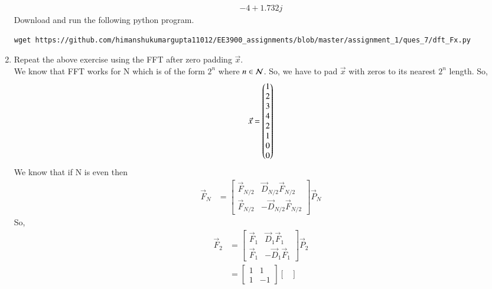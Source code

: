 \documentclass[journal,12pt,twocolumn]{IEEEtran}
\renewcommand\thesection{\arabic{section}}
\begin{document}
\begin{enumerate}[label=\arabic*.,ref=\thesection.\theenumi]
\begin{align}
{                     -4+1.732j}
           \end{align}
           Download and run the following python program.
           \begin{lstlisting}
wget https://github.com/himanshukumargupta11012/EE3900_assignments/blob/master/assignment_1/ques_7/dft_Fx.py
           \end{lstlisting}
     \item Repeat the above exercise using the FFT
           after zero padding $\vec{x}$. \\
           \solution  We know that FFT works for N  which is of the form $2^n$ where $n\in \cal N$.
           So, we have to pad $\vec{x}$ with zeros to its nearest $2^n$ length.
           So,
           \begin{align}
                \vec{x}=\begin{pmatrix}1 \\2\\3\\4\\2\\1\\0\\0\end{pmatrix}
           \end{align}
           We know that if N is even then
           \begin{align}
                \vec{F}_N & =\begin{bmatrix}
                                  \vec{F}_{N/2} & \vec{D}_{N/2}\vec{F}_{N/2}  \\
                                  \vec{F}_{N/2} & -\vec{D}_{N/2}\vec{F}_{N/2}
                             \end{bmatrix}\vec{P}_N
           \end{align}
           So,
           \begin{align}
                \vec{F}_2 & =\begin{bmatrix}
                                  \vec{F}_{1} & \vec{D}_{1}\vec{F}_{1}  \\
                                  \vec{F}_{1} & -\vec{D}_{1}\vec{F}_{1}
                             \end{bmatrix}\vec{P}_2 \\
                          & =\begin{bmatrix}
                                  1 & 1  \\
                                  1 & -1
                             \end{bmatrix}
                \begin{bmatrix}

\end{bmatrix}
\end{align}
\end{enumerate}
\end{document}

